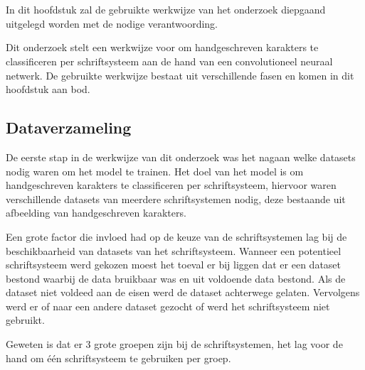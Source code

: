 
\chapter{}
\label{ch:methodologie}


In dit hoofdstuk zal de gebruikte werkwijze van het onderzoek diepgaand uitgelegd worden met de nodige verantwoording.

Dit onderzoek stelt een werkwijze voor om handgeschreven karakters te classificeren per schriftsysteem aan de hand van een convolutioneel neuraal netwerk.
De gebruikte werkwijze bestaat uit verschillende fasen en komen in dit hoofdstuk aan bod.


\section{Dataverzameling}

De eerste stap in de werkwijze van dit onderzoek was het nagaan welke datasets nodig waren om het model te trainen.
Het doel van het model is om handgeschreven karakters te classificeren per schriftsysteem, hiervoor waren verschillende datasets van meerdere schriftsystemen nodig, deze bestaande uit afbeelding van handgeschreven karakters.

Een grote factor die invloed had op de keuze van de schriftsystemen lag bij de beschikbaarheid van datasets van het schriftsysteem.
Wanneer een potentieel schriftsysteem werd gekozen moest het toeval er bij liggen dat er een dataset bestond waarbij de data bruikbaar was en uit voldoende data bestond.
Als de dataset niet voldeed aan de eisen werd de dataset achterwege gelaten.
Vervolgens werd er of naar een andere dataset gezocht of werd het schriftsysteem niet gebruikt.



Geweten is dat er 3 grote groepen zijn bij de schriftsystemen, het lag voor de hand om één schriftsysteem te gebruiken per groep.

